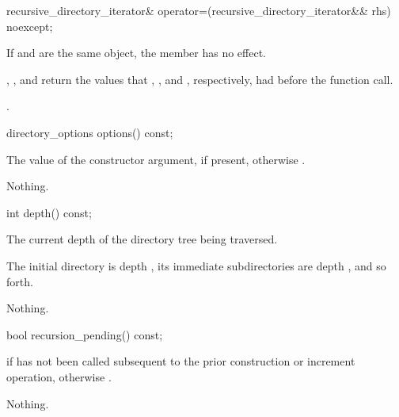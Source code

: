 \begin{itemdecl}
recursive_directory_iterator& operator=(recursive_directory_iterator&& rhs) noexcept;
\end{itemdecl}

\begin{itemdescr}
\pnum
\effects If  and  are the same
object, the member has no effect.

\pnum
\postconditions {}, ,
and  return the values that ,
, and , respectively, had before the function call.

\pnum
\returns {}.
\end{itemdescr}

\begin{itemdecl}
directory_options options() const;
\end{itemdecl}

\begin{itemdescr}
\pnum
\returns The value of the constructor  argument,
if present, otherwise .

\pnum
\throws Nothing.
\end{itemdescr}

\begin{itemdecl}
int depth() const;
\end{itemdecl}

\begin{itemdescr}
\pnum
\returns The current depth of the directory tree being traversed. \begin{note}
  The initial directory is depth , its immediate subdirectories are depth ,
  and so forth. \end{note}

\pnum
\throws Nothing.
\end{itemdescr}

\begin{itemdecl}
bool recursion_pending() const;
\end{itemdecl}

\begin{itemdescr}
\pnum
\returns {} if 
  has not been called subsequent to the prior construction or increment
  operation, otherwise .

\pnum
\throws Nothing.
\end{itemdescr}

